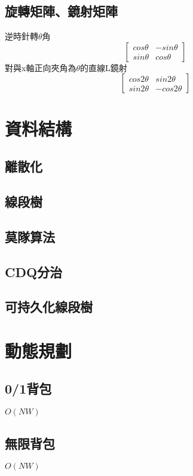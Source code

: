 \documentclass[a4paper,10pt,twocolumn,oneside]{article}
\begin{document}
\subsection{旋轉矩陣、鏡射矩陣}
逆時針轉$\theta$角
\[\begin{bmatrix}
  cos\theta&-sin\theta  \\
  sin\theta &cos\theta 
\end{bmatrix}\]
對與x軸正向夾角為$\theta$的直線L鏡射
\[\begin{bmatrix}
  cos2\theta & sin2\theta  \\
  sin2\theta & -cos2\theta 
\end{bmatrix}\]

\section{資料結構}
\subsection{離散化}

\subsection{線段樹}

\subsection{莫隊算法}

\subsection{CDQ分治}

\subsection{可持久化線段樹}


\section{動態規劃}
\subsection{0/1背包}
$O(NW)$

\subsection{無限背包}
$O(NW)$

\end{document}
